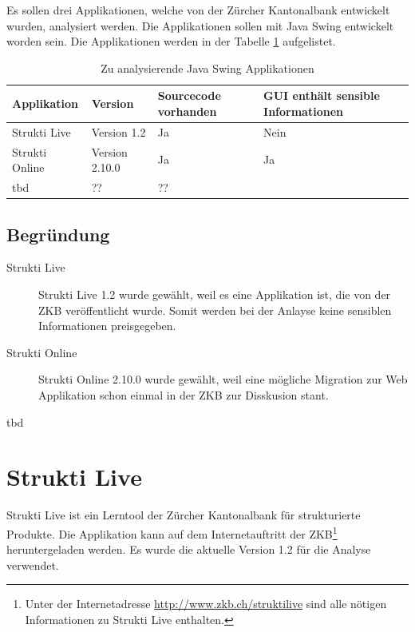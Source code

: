   Es sollen drei Applikationen, welche von der Zürcher Kantonalbank entwickelt
  wurden, analysiert werden. Die Applikationen sollen mit Java Swing entwickelt
  worden sein. Die Applikationen werden in der Tabelle
  \ref{tab:zuAnalysierendeJavaSwingApplikationen} aufgelistet.
  \newline
  
  \begin{table}[ht]
    \begin{center}
      \begin{tabular}{llp{2cm}p{3.5cm}}
        \toprule
        Applikation & Version & Sourcecode vorhanden & GUI enthält sensible
        Informationen\\
        \midrule
        Strukti Live & Version 1.2 & Ja & Nein\\
        Strukti Online & Version 2.10.0 & Ja & Ja\\
        tbd & ?? & ??\\
        \bottomrule
      \end{tabular}
      \caption{Zu analysierende Java Swing Applikationen}
      \label{tab:zuAnalysierendeJavaSwingApplikationen}
    \end{center}
  \end{table}
  
  \subsection{Begründung}
  
  \begin{description}
  \item[Strukti Live]
  Strukti Live 1.2 wurde gewählt, weil es eine Applikation ist, die
  von der ZKB veröffentlicht wurde. Somit werden bei der Anlayse keine
  sensiblen Informationen preisgegeben.
  \item[Strukti Online]
  Strukti Online 2.10.0 wurde gewählt, weil eine mögliche Migration
  zur Web Applikation schon einmal in der \ac{ZKB} zur Disskusion stant.
  \item[tbd]
  \end{description}
  
  \section{Strukti Live}
  
  Strukti Live ist ein Lerntool der Zürcher Kantonalbank für strukturierte
  Produkte. Die Applikation kann auf dem Internetauftritt der
  \ac{ZKB}\footnote{Unter der Internetadresse
  \url{http://www.zkb.ch/struktilive} sind alle nötigen Informationen zu Strukti
  Live enthalten.} heruntergeladen werden. Es wurde die aktuelle Version 1.2 für
  die Analyse verwendet.
  
